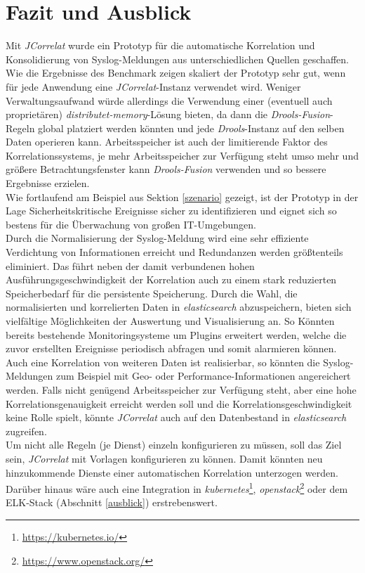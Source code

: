 \chapter{Fazit und Ausblick}
\thispagestyle{fancy}

Mit \textit{JCorrelat} wurde ein Prototyp für die automatische Korrelation und 
Konsolidierung von Syslog-Meldungen aus unterschiedlichen Quellen geschaffen. Wie die 
Ergebnisse des Benchmark zeigen skaliert der Prototyp sehr gut, wenn für jede Anwendung 
eine \textit{JCorrelat}-Instanz verwendet wird. Weniger Verwaltungsaufwand würde 
allerdings die Verwendung einer (eventuell auch proprietären) 
\textit{distributet-memory}-Lösung bieten, da dann die \textit{Drools-Fusion}-Regeln 
global platziert werden könnten und jede \textit{Drools}-Instanz auf den selben Daten 
operieren kann. Arbeitsspeicher ist auch der limitierende Faktor des Korrelationssystems, 
je mehr Arbeitsspeicher zur Verfügung steht umso mehr und größere Betrachtungsfenster 
kann \textit{Drools-Fusion} verwenden und so bessere Ergebnisse erzielen.\\
Wie fortlaufend am Beispiel aus Sektion \ref{szenario} gezeigt, ist der Prototyp in der 
Lage Sicherheitskritische Ereignisse sicher zu identifizieren und eignet sich so bestens 
für die Überwachung von großen IT-Umgebungen.\\

Durch die Normalisierung der Syslog-Meldung wird eine sehr effiziente Verdichtung von 
Informationen erreicht und Redundanzen werden größtenteils eliminiert. Das führt neben 
der damit verbundenen hohen Ausführungsgeschwindigkeit der Korrelation auch zu einem 
stark reduzierten Speicherbedarf für die persistente Speicherung. Durch die Wahl, die 
normalisierten und korrelierten Daten in \textit{elasticsearch} abzuspeichern, bieten 
sich vielfältige Möglichkeiten der Auswertung und Visualisierung an. So Könnten bereits 
bestehende Monitoringsysteme um Plugins erweitert werden, welche die zuvor erstellten 
Ereignisse periodisch abfragen und somit alarmieren können.\\

Auch eine Korrelation von weiteren Daten ist realisierbar, so könnten die 
Syslog-Meldungen zum Beispiel mit Geo- oder Performance-Informationen angereichert 
werden. Falls nicht genügend Arbeitsspeicher zur Verfügung steht, aber eine hohe 
Korrelationsgenauigkeit erreicht werden soll und die Korrelationsgeschwindigkeit keine 
Rolle spielt, könnte \textit{JCorrelat} auch auf den Datenbestand in 
\textit{elasticsearch} zugreifen.\\
Um nicht alle Regeln (je Dienst) einzeln konfigurieren zu müssen, soll das Ziel sein, 
\textit{JCorrelat} mit Vorlagen konfigurieren zu können. Damit könnten neu hinzukommende 
Dienste einer automatischen Korrelation unterzogen werden. Darüber hinaus wäre auch eine 
Integration in \textit{kubernetes}\footnote{\url{https://kubernetes.io/}}, 
\textit{openstack}\footnote{\url{https://www.openstack.org/}} oder dem ELK-Stack 
(Abschnitt \ref{ausblick}) erstrebenswert. 